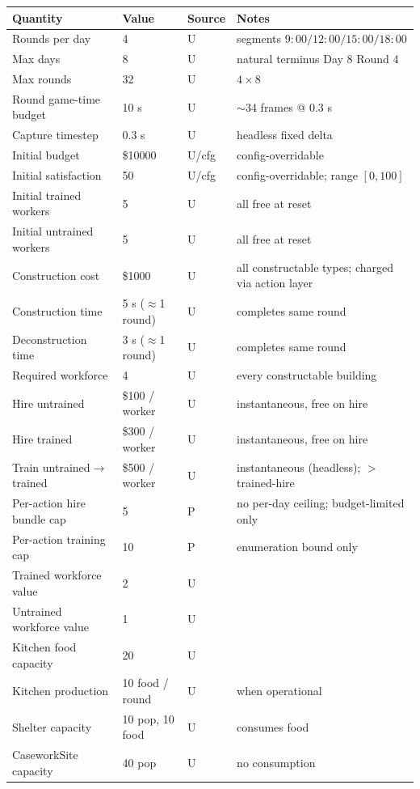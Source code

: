 \documentclass[11pt]{article}
\begin{document}
\begin{longtable}{@{}llll@{}}
\toprule
Quantity & Value & Source & Notes \\
\midrule
\endhead
Rounds per day & 4 & U & segments $9{:}00/12{:}00/15{:}00/18{:}00$ \\
Max days & 8 & U & natural terminus Day 8 Round 4 \\
Max rounds & 32 & U & $4\times8$ \\
Round game-time budget & 10 s & U & $\sim$34 frames @ 0.3 s \\
Capture timestep & 0.3 s & U & headless fixed delta \\
Initial budget & \$10000 & U/cfg & config-overridable \\
Initial satisfaction & 50 & U/cfg & config-overridable; range $[0,100]$ \\
Initial trained workers & 5 & U & all free at reset \\
Initial untrained workers & 5 & U & all free at reset \\
Construction cost & \$1000 & U & all constructable types; charged via action layer \\
Construction time & 5 s ($\approx$1 round) & U & completes same round \\
Deconstruction time & 3 s ($\approx$1 round) & U & completes same round \\
Required workforce & 4 & U & every constructable building \\
Hire untrained & \$100 / worker & U & instantaneous, free on hire \\
Hire trained & \$300 / worker & U & instantaneous, free on hire \\
Train untrained$\to$trained & \$500 / worker & U & instantaneous (headless); $>$ trained-hire \\
Per-action hire bundle cap & 5 & P & no per-day ceiling; budget-limited only \\
Per-action training cap & 10 & P & enumeration bound only \\
Trained workforce value & 2 & U & \\
Untrained workforce value & 1 & U & \\
Kitchen food capacity & 20 & U & \\
Kitchen production & 10 food / round & U & when operational \\
Shelter capacity & 10 pop, 10 food & U & consumes food \\
CaseworkSite capacity & 40 pop & U & no consumption \\

\end{longtable}
\end{document}
